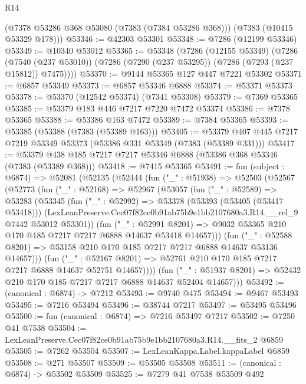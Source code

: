 \begin{lexlean}{R14}
\begin{coremodule}
      (@7378 @53286 @368 @53080 (@7383 (@7384 @53286 @368)))
      (@7383 (@10415 @53329 @178)))
@53346 := @42303 @53301
@53348 := @7286 (@12199 @53346)
@53349 := @10340 @53012
@53365 := @53348
    (@7286
      (@12155 @53349)
      (@7286
        (@7540 (@237 @53010))
        (@7286 (@7290 (@237 @53295)) (@7286 (@7293 (@237 @15812)) @7475))))
@53370 := @9144 @53365 @127 @447 @7221 @53302
@53371 := @6857 @53349
@53373 := @6857 @53346 @6888
@53374 := @53371 @53373
@53378 := @53370 (@12542 @53374) (@7341 @53308)
@53379 := @7369 @53365
@53385 := @53379 @183 @446 @7217 @7220 @7472 @53374
@53386 := @7378 @53365
@53388 := @53386 @163 @7472
@53389 := @7384 @53365
@53393 := @53385 (@53388 (@7383 (@53389 @163)))
@53405 := @53379 @407 @445 @7217 @7219 @53349 @53373 (@53386 @331 @53349 (@7383 (@53389 @331)))
@53417 := @53379 @438 @185 @7217 @7217 @53346 @6888 (@53386 @368 @53346 (@7383 (@53389 @368)))
@53418 := @7415 @53365
@53491 := fun (subject : @6874) =>
  @52081
    (@52135
      (@52444
        (fun ("_" : @51938) =>
        @52503
          (@52567
            (@52773
              (fun ("_" : @52168) =>
              @52967
                (@53057
                  (fun ("_" : @52589) =>
                  @53283
                    (@53345
                      (fun ("_" : @52992) =>
                      @53378
                        (@53393 (@53405 (@53417 @53418)))
                        (LexLeanPreserve.Cec07f82ce0b91ab75b9e1bb2107680a3.R14.__rel_9
                          @7442
                          @53012
                          @53301))
                      (fun ("_" : @52991 @8201) =>
                      @9032 @53365 @210 @170 @185 @7217 @7217 @6888 @14637 @53418 @14657)))
                  (fun ("_" : @52588 @8201) =>
                  @53158 @210 @170 @185 @7217 @7217 @6888 @14637 @53136 @14657)))
              (fun ("_" : @52167 @8201) =>
              @52761 @210 @170 @185 @7217 @7217 @6888 @14637 @52751 @14657))))
        (fun ("_" : @51937 @8201) => @52432 @210 @170 @185 @7217 @7217 @6888 @14637 @52404 @14657)))
@53492 := (canonical : @6874) -> @7212
@53493 := @9740 @475
@53494 := @9467 @53493
@53495 := @7216 @53494
@53496 := @38744 @7217
@53497 := @53495 @53496
@53500 := fun (canonical : @6874) => @7216 @53497 @7217
@53502 := @7250 @41 @7538
@53504 := LexLeanPreserve.Cec07f82ce0b91ab75b9e1bb2107680a3.R14.__fits_2 @6859
@53505 := @7262 @53504
@53507 := LexLeanKappa.Label.kappaLabel @6859
@53508 := @271 @53507
@53509 := @53505 @53508
@53511 := (canonical : @6874) -> @53502 @53509
@53525 := @7279
    @41
    @7538
    @53509
    @492

\end{coremodule}
\end{lexlean}
